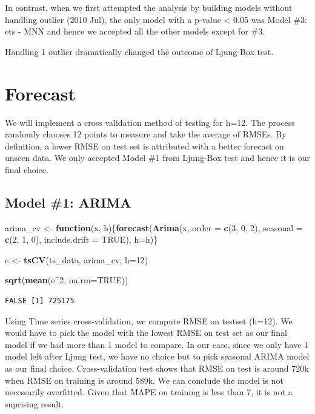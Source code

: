 \documentclass[openany]{book}
\newenvironment{Shaded}{\begin{snugshade}}{\end{snugshade}}
\newcommand{\KeywordTok}[1]{\textcolor[rgb]{0.13,0.29,0.53}{\textbf{#1}}}
\newcommand{\DataTypeTok}[1]{\textcolor[rgb]{0.13,0.29,0.53}{#1}}
\newcommand{\DecValTok}[1]{\textcolor[rgb]{0.00,0.00,0.81}{#1}}
\newcommand{\StringTok}[1]{\textcolor[rgb]{0.31,0.60,0.02}{#1}}
\newcommand{\OtherTok}[1]{\textcolor[rgb]{0.56,0.35,0.01}{#1}}
\newcommand{\ControlFlowTok}[1]{\textcolor[rgb]{0.13,0.29,0.53}{\textbf{#1}}}
\newcommand{\OperatorTok}[1]{\textcolor[rgb]{0.81,0.36,0.00}{\textbf{#1}}}
\newcommand{\NormalTok}[1]{#1}
\begin{document}
In contrast, when we first attempted the analysis by building models
without handling outlier (2010 Jul), the only model with a p-value
\textless{} 0.05 was Model \#3: ets - MNN and hence we accepted all the
other models except for \#3.

Handling 1 outlier dramatically changed the outcome of Ljung-Box test.

\section*{Forecast}\label{b-forecast}

We will implement a cross validation method of testing for h=12. The
process randomly chooses 12 points to measure and take the average of
RMSEs. By definition, a lower RMSE on test set is attributed with a
better forecast on unseen data. We only accepted Model \#1 from
Ljung-Box test and hence it is our final choice.

\subsection{Model \#1: ARIMA}\label{model-1-arima-1}

\begin{Shaded}
\begin{Highlighting}[]
\NormalTok{arima_cv <-}\StringTok{ }\ControlFlowTok{function}\NormalTok{(x, h)\{}\KeywordTok{forecast}\NormalTok{(}\KeywordTok{Arima}\NormalTok{(x, }\DataTypeTok{order =} \KeywordTok{c}\NormalTok{(}\DecValTok{3}\NormalTok{, }\DecValTok{0}\NormalTok{, }\DecValTok{2}\NormalTok{), }\DataTypeTok{seasonal =} \KeywordTok{c}\NormalTok{(}\DecValTok{2}\NormalTok{, }\DecValTok{1}\NormalTok{, }\DecValTok{0}\NormalTok{), }\DataTypeTok{include.drift =} \OtherTok{TRUE}\NormalTok{), }\DataTypeTok{h=}\NormalTok{h)\}}

\NormalTok{e <-}\StringTok{ }\KeywordTok{tsCV}\NormalTok{(ts_data, arima_cv, }\DataTypeTok{h=}\DecValTok{12}\NormalTok{)}

\KeywordTok{sqrt}\NormalTok{(}\KeywordTok{mean}\NormalTok{(e}\OperatorTok{^}\DecValTok{2}\NormalTok{, }\DataTypeTok{na.rm=}\OtherTok{TRUE}\NormalTok{))}
\end{Highlighting}
\end{Shaded}

\begin{verbatim}
FALSE [1] 725175
\end{verbatim}

Using Time series cross-validation, we compute RMSE on testset (h=12).
We would have to pick the model with the lowest RMSE on test set as our
final model if we had more than 1 model to compare. In our case, since
we only have 1 model left after Ljung test, we have no choice but to
pick seasonal ARIMA model as our final choice. Cross-validation test
shows that RMSE on test is around 720k when RMSE on training is around
589k. We can conclude the model is not necessarily overfitted. Given
that MAPE on training is less than 7, it is not a suprising result.
\end{document}
